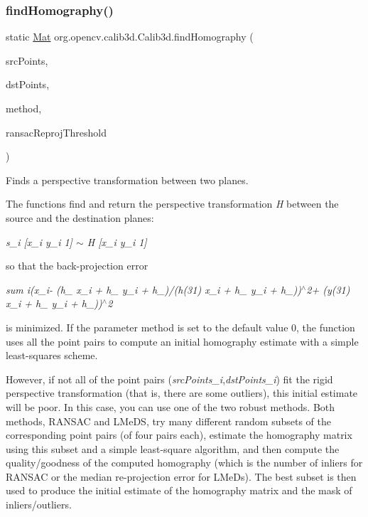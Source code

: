 \subsubsection{\texorpdfstring{find\+Homography()}{findHomography()}\hspace{0.1cm}{\footnotesize\ttfamily [2/3]}}
{\footnotesize\ttfamily static \mbox{\hyperlink{classorg_1_1opencv_1_1core_1_1_mat}{Mat}} org.\+opencv.\+calib3d.\+Calib3d.\+find\+Homography (\begin{DoxyParamCaption}\item[{\mbox{\hyperlink{classorg_1_1opencv_1_1core_1_1_mat_of_point2f}{Mat\+Of\+Point2f}}}]{src\+Points,  }\item[{\mbox{\hyperlink{classorg_1_1opencv_1_1core_1_1_mat_of_point2f}{Mat\+Of\+Point2f}}}]{dst\+Points,  }\item[{int}]{method,  }\item[{double}]{ransac\+Reproj\+Threshold }\end{DoxyParamCaption})\hspace{0.3cm}{\ttfamily [static]}}

Finds a perspective transformation between two planes.

The functions find and return the perspective transformation {\itshape H} between the source and the destination planes\+:

{\itshape s\+\_\+i \mbox{[}x\textquotesingle{}\+\_\+i y\textquotesingle{}\+\_\+i 1\mbox{]} $\sim$ H \mbox{[}x\+\_\+i y\+\_\+i 1\mbox{]}}

so that the back-\/projection error

{\itshape sum {\itshape i(x\textquotesingle{}\+\_\+i-\/ (h\+\_ x\+\_\+i + h\+\_ y\+\_\+i + h\+\_)/(h}(31) x\+\_\+i + h\+\_ y\+\_\+i + h\+\_))$^\wedge$2+ (y(31) x\+\_\+i + h\+\_ y\+\_\+i + h\+\_))$^\wedge$2}

is minimized. If the parameter {\ttfamily method} is set to the default value 0, the function uses all the point pairs to compute an initial homography estimate with a simple least-\/squares scheme.

However, if not all of the point pairs ({\itshape src\+Points\+\_\+i},{\itshape dst\+Points\+\_\+i}) fit the rigid perspective transformation (that is, there are some outliers), this initial estimate will be poor. In this case, you can use one of the two robust methods. Both methods, {\ttfamily R\+A\+N\+S\+AC} and {\ttfamily L\+Me\+DS}, try many different random subsets of the corresponding point pairs (of four pairs each), estimate the homography matrix using this subset and a simple least-\/square algorithm, and then compute the quality/goodness of the computed homography (which is the number of inliers for R\+A\+N\+S\+AC or the median re-\/projection error for L\+Me\+Ds). The best subset is then used to produce the initial estimate of the homography matrix and the mask of inliers/outliers.

